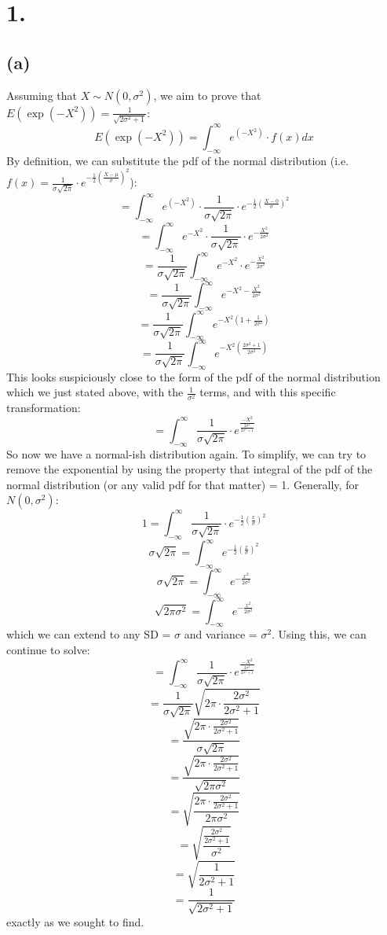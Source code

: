 \documentclass{article}
\begin{document}
\thispagestyle{firstpageheader}
{\Large 

\section*{1.}

\subsection*{(a)} 

Assuming that \(X \sim N(0, \sigma^2)\), we aim to prove that \(E(\exp(-X^2)) = \frac{1}{\sqrt{2\sigma^2 + 1}}\):
\[
  E(\exp(-X^2)) = \int_{-\infty}^{\infty} e^{(-X^2)} \cdot f(x) dx
\]
By definition, we can substitute the pdf of the normal distribution (i.e. \(f(x) = \frac{1}{\sigma\sqrt{2\pi}} \cdot e^{-\frac{1}{2}(\frac{X - \mu}{\sigma})^2}\)):
\[
  = \int_{-\infty}^{\infty} e^{(-X^2)} \cdot \frac{1}{\sigma\sqrt{2\pi}} \cdot e^{-\frac{1}{2}(\frac{X - 0}{\sigma})^2}
\]
\[
  = \int_{-\infty}^{\infty} e^{-X^2} \cdot \frac{1}{\sigma\sqrt{2\pi}} \cdot e^{-\frac{X^2}{2\sigma^2}}
\]
\[
  = \frac{1}{\sigma\sqrt{2\pi}} \int_{-\infty}^{\infty} e^{-X^2} \cdot e^{-\frac{X^2}{2\sigma^2}}
\]
\[
  = \frac{1}{\sigma\sqrt{2\pi}} \int_{-\infty}^{\infty} e^{-X^2 - \frac{X^2}{2\sigma^2}}
\]
\[
  = \frac{1}{\sigma\sqrt{2\pi}} \int_{-\infty}^{\infty} e^{-X^2 (1 + \frac{1}{2\sigma^2})}
\]
\[
  = \frac{1}{\sigma\sqrt{2\pi}} \int_{-\infty}^{\infty} e^{-X^2 (\frac{2\sigma^2 + 1}{2\sigma^2})}
\]
This looks suspiciously close to the form of the pdf of the normal distribution which we just stated above, with the \(\frac{1}{\sigma^2}\) terms, and with this specific transformation: 
\[
  = \int_{-\infty}^{\infty} \frac{1}{\sigma\sqrt{2\pi}} \cdot e^{\frac{-X^2}{\frac{2\sigma^2}{2\sigma^2 + 1}}}
\]
So now we have a normal-ish distribution again. To simplify, we can try to remove the exponential by using the property that integral of the pdf of the normal distribution (or any valid pdf for that matter) = 1. Generally, for \(N(0, \sigma^2)\):
\[
  1 = \int_{-\infty}^{\infty} \frac{1}{\sigma\sqrt{2\pi}} \cdot e^{-\frac{1}{2}(\frac{x}{\sigma})^2}
\]
\[
  \sigma\sqrt{2\pi} = \int_{-\infty}^{\infty} e^{-\frac{1}{2}(\frac{x}{\sigma})^2}
\]
\[
  \sigma\sqrt{2\pi} = \int_{-\infty}^{\infty} e^{-\frac{x^2}{2\sigma^2}}
\]
\[
  \sqrt{2\pi\sigma^2} = \int_{-\infty}^{\infty} e^{-\frac{x^2}{2\sigma^2}}
\]
which we can extend to any SD = \(\sigma\) and variance = \(\sigma^2\). Using this, we can continue to solve:
\[
  = \int_{-\infty}^{\infty} \frac{1}{\sigma\sqrt{2\pi}} \cdot e^{\frac{-X^2}{\frac{2\sigma^2}{2\sigma^2 + 1}}}
\]
\[
  = \frac{1}{\sigma\sqrt{2\pi}} \sqrt{2\pi \cdot \frac{2\sigma^2}{2\sigma^2 + 1}} 
\]
\[
  = \frac{\sqrt{2\pi \cdot \frac{2\sigma^2}{2\sigma^2 + 1}} }{\sigma\sqrt{2\pi}}
\]
\[
  = \frac{\sqrt{2\pi \cdot \frac{2\sigma^2}{2\sigma^2 + 1}} }{\sqrt{2\pi\sigma^2}}
\]
\[
  = \sqrt{\frac{2\pi \cdot \frac{2\sigma^2}{2\sigma^2 + 1} }{2\pi\sigma^2}}
\]
\[
  = \sqrt{\frac{\frac{2\sigma^2}{2\sigma^2 + 1} }{\sigma^2}}
\]
\[
  = \sqrt{\frac{1}{2\sigma^2 + 1} }
\]
\[
  = \frac{1}{\sqrt{2\sigma^2 + 1}}
\]
exactly as we sought to find.

}
\end{document}
